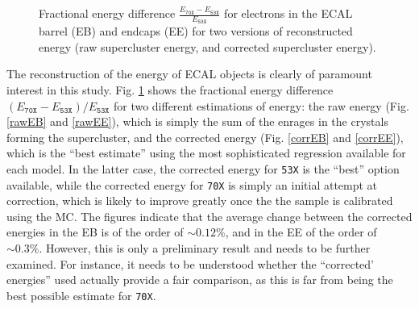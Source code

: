 \documentclass[10pt]{article}
\begin{document}
\begin{figure}[h!]
\begin{subfigure}[b]{0.4\textwidth}
        \end{subfigure}
        \caption{Fractional energy difference $\frac{E_\texttt{70X} -E_\texttt{53X}}{E_\texttt{53X}}$ for electrons in the ECAL barrel (EB) and endcaps (EE) for two versions of reconstructed energy (raw supercluster energy, and corrected supercluster energy).}
        \label{energyValidation}
\end{figure}

The reconstruction of the energy of ECAL objects is clearly of paramount interest in this study. Fig. \ref{energyValidation} shows the fractional energy difference $(E_\texttt{70X}-E_\texttt{53X})/E_\texttt{53X}$ for two different estimations of energy: the raw energy (Fig. \ref{rawEB} and \ref{rawEE}), which is simply the sum of the enrages in the crystals forming the supercluster, and the corrected energy (Fig. \ref{corrEB} and \ref{corrEE}), which is the ``best estimate'' using the most sophisticated regression available for each model. In the latter case, the corrected energy for \texttt{53X} is the ``best'' option available, while the corrected energy for \texttt{70X} is simply an initial attempt at correction, which is likely to improve greatly once the the sample is calibrated using the MC. The figures indicate that the average change between the corrected energies in the EB is of the order of $\sim 0.12\%$, and in the EE of the order of $\sim0.3\%$. However, this is only a preliminary result and needs to be further examined. For instance, it needs to be understood whether the ``corrected' energies'' used actually provide a fair comparison, as this is far from being the best possible estimate for \texttt{70X}.
\end{document}

